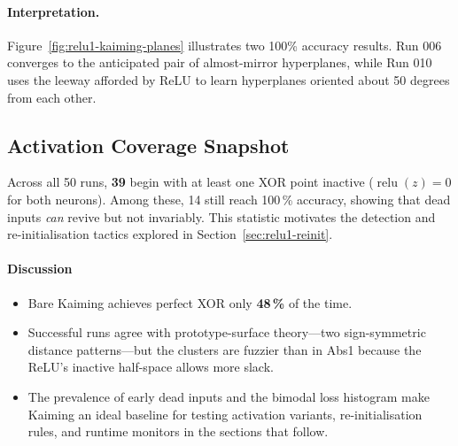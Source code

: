 \paragraph{Interpretation.}
Figure~\ref{fig:relu1-kaiming-planes} illustrates two 100\% accuracy results. Run 006 converges to the anticipated pair of almost-mirror hyperplanes, while Run 010 uses the leeway afforded by ReLU to learn hyperplanes oriented about 50 degrees from each other.

\subsection*{Activation Coverage Snapshot}

Across all 50 runs, \textbf{39} begin with at least one XOR point inactive (\(\operatorname{relu}(z)=0\) for both neurons). 
Among these, 14 still reach 100\,\% accuracy, showing that dead inputs \emph{can} revive but not invariably.
This statistic motivates the detection and re-initialisation tactics explored in Section~\ref{sec:relu1-reinit}.

\paragraph{Discussion}
\begin{itemize}
  \item Bare Kaiming achieves perfect XOR only \textbf{48\,\%} of the time.
  \item Successful runs agree with prototype-surface theory—two sign-symmetric
        distance patterns—but the clusters are fuzzier than in Abs1 because
        the ReLU's inactive half-space allows more slack.
  \item The prevalence of early dead inputs and the bimodal loss histogram
        make Kaiming an ideal baseline for testing activation variants,
        re-initialisation rules, and runtime monitors in the sections that
        follow.
\end{itemize}

\hrulefill
